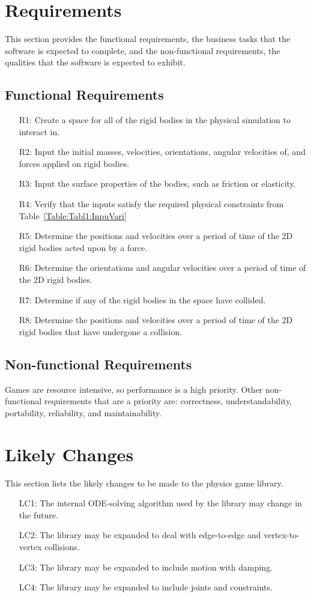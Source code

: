 \documentclass[12pt]{article}
\begin{document}
\section{Requirements}
\label{Sec:Requ}
This section provides the functional requirements, the business tasks that the software is expected to complete, and the non-functional requirements, the qualities that the software is expected to exhibit.
\subsection{Functional Requirements}
\label{Sec:FuncRequ}
\begin{itemize}
\item[R1:]Create a space for all of the rigid bodies in the physical simulation to interact in.
\item[R2:]Input the initial masses, velocities, orientations, angular velocities of, and forces applied on rigid bodies.
\item[R3:]Input the surface properties of the bodies, such as friction or elasticity.
\item[R4:]Verify that the inputs satisfy the required physical constraints from Table~\ref{Table:Tabl1:InpuVari}
\item[R5:]Determine the positions and velocities over a period of time of the 2D rigid bodies acted upon by a force.
\item[R6:]Determine the orientations and angular velocities over a period of time of the 2D rigid bodies.
\item[R7:]Determine if any of the rigid bodies in the space have collided.
\item[R8:]Determine the positions and velocities over a period of time of the 2D rigid bodies that have undergone a collision.
\end{itemize}
\subsection{Non-functional Requirements}
\label{Sec:Non-Requ}
Games are resource intensive, so performance is a high priority. Other non-functional requirements that are a priority are: correctness, understandability, portability, reliability, and maintainability.
\section{Likely Changes}
\label{Sec:LikeChan}
This section lists the likely changes to be made to the physics game library.
\begin{itemize}
\item[LC1:]The internal ODE-solving algorithm used by the library may change in the future.
\item[LC2:]The library may be expanded to deal with edge-to-edge and vertex-to-vertex collisions.
\item[LC3:]The library may be expanded to include motion with damping.
\item[LC4:]The library may be expanded to include joints and constraints.
\end{itemize}
\end{document}
